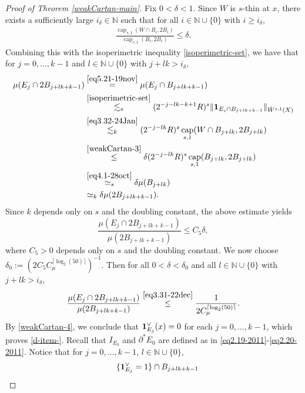 \documentclass[11pt,leqno]{amsart}
\numberwithin{equation}{section}
\theoremstyle{definition}
\DeclareMathOperator{\capp}{cap}
\newcommand{\caps}{\capp_{s,1}}
\begin{document}
\begin{proof}[Proof of Theorem \ref{weakCartan-main}]
		Fix $0<\delta <1$.
		Since $W$ is $s$-thin at $x$, there exists a sufficiently large $i_\delta\in \mathbb N$ such that for all $i\in\mathbb N\cup\{0\}$ with $i\geq i_\delta$,
		\begin{align}\label{weakCartan-3}
			\frac{\caps(W\cap B_i,2B_i)}{\caps(B_i,2B_i)}\leq \delta.   
		\end{align}
		Combining this with the isoperimetric inequality \eqref{isoperimetric-set}, we have that for $j=0,\ldots,k-1$ and $l\in\mathbb N\cup\{0\}$ with $j+lk> i_{\delta}$,
		\begin{align*}
			\mu(E_j\cap 2B_{j+lk+k-1})&\overset{\eqref{eq5.21-19nov}}{=}\mu(E_j\cap B_{j+lk+k-1})\\
			&\overset{\eqref{isoperimetric-set}}{\lesssim_s} (2^{-j-lk-k+1}R)^s\|{\bf 1}_{E_j\cap B_{j+lk+k-1}}\|_{\dot W^{s,1}(X)}\\
			&\overset{\eqref{eq3.32-24Jan}}{\lesssim_k}  (2^{-j-lk}R)^s \caps(W\cap B_{j+lk},2B_{j+lk})\\
			&\overset{\eqref{weakCartan-3}}{\leq} \delta  (2^{-j-lk}R)^s \caps(B_{j+lk},2B_{j+lk})\\
			&\overset{\eqref{eq4.1-28oct}}{\simeq_s}  \delta \mu(B_{j+lk})\\
			&\simeq_k \delta\mu(2B_{j+lk+k-1}).
		\end{align*}
		Since $k$ depends only on $s$ and the doubling constant, the above estimate yields
		\begin{equation}\label{eq3.31-22dec}
			\frac{\mu(E_j\cap 2B_{j+lk+k-1})}{\mu(2B_{j+lk+k-1})}\le C_5\delta,
		\end{equation}
		where $C_5>0$ depends only on $s$ and the doubling constant.
		We now choose $\delta_0:=\left(2C_5C_{\mu}^{\lceil \log_2(50) \rceil} \right)^{-1}$.  
		Then for all $0<\delta<\delta_0$ and all $l\in \mathbb N\cup\{0\}$ with $j+lk>i_\delta$,
		\begin{align}
			\frac{\mu(E_j\cap 2B_{j+lk+k-1})}{\mu(2B_{j+lk+k-1})}
			\overset{\eqref{eq3.31-22dec}}{\le} \frac{1}{2C_\mu^{\lceil \log_2(50)\rceil}}.\label{weakCartan-4}
		\end{align}
		{By \eqref{weakCartan-4},}
		we conclude that ${\bf 1}_{E_j}^\vee(x)=0$ for each $j=0,\ldots,k-1$, which proves \ref{d-item-}.
		Recall that $I_{E_0}$ and $\partial^*E_0$ are defined  as in \eqref{eq2.19-2011}-\eqref{eq2.20-2011}.
		Notice that for $j=0,\ldots,k-1$, $l\in\mathbb N\cup\{0\}$,
		\begin{align*}
			&\quad \{{\bf 1}_{E_j}^\vee=1\}\cap B_{j+lk+k-1}\\

\end{align*}
\end{proof}
\end{document}
